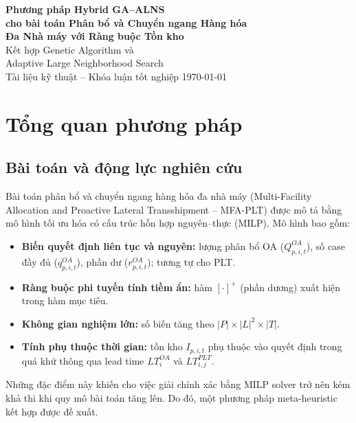 \documentclass[12pt]{article}
\newcommand{\QOA}{Q^{OA}}
\newcommand{\qOA}{q^{OA}}
\newcommand{\rOA}{r^{OA}}
\newcommand{\pos}[1]{\left[#1\right]^+}
\begin{document}
\begin{titlepage}
  \centering
  \vspace*{2cm}
  {\LARGE\bfseries Phương pháp Hybrid GA--ALNS\\[0.5em]
  cho bài toán Phân bổ và Chuyển ngang Hàng hóa\\[0.5em]
  Đa Nhà máy với Ràng buộc Tồn kho}\\[2cm]
  {\large Kết hợp Genetic Algorithm và\\
  Adaptive Large Neighborhood Search}\\[3cm]
  {\normalsize Tài liệu kỹ thuật -- Khóa luận tốt nghiệp}
  \vfill
  {\large \today}
\end{titlepage}

\tableofcontents
\newpage


\section{Tổng quan phương pháp}

\subsection{Bài toán và động lực nghiên cứu}

Bài toán phân bổ và chuyển ngang hàng hóa đa nhà máy (Multi-Facility Allocation and Proactive Lateral Transshipment -- MFA-PLT) được mô tả bằng mô hình tối ưu hóa có cấu trúc hỗn hợp nguyên--thực (MILP). Mô hình bao gồm:

\begin{itemize}
  \item \textbf{Biến quyết định liên tục và nguyên:} lượng phân bổ OA ($\QOA_{p,i,t}$), số case đầy đủ ($\qOA_{p,i,t}$), phần dư ($\rOA_{p,i,t}$); tương tự cho PLT.
  \item \textbf{Ràng buộc phi tuyến tính tiềm ẩn:} hàm $\pos{\cdot}$ (phần dương) xuất hiện trong hàm mục tiêu.
  \item \textbf{Không gian nghiệm lớn:} số biến tăng theo $|P| \times |L|^2 \times |T|$.
  \item \textbf{Tính phụ thuộc thời gian:} tồn kho $I_{p,i,t}$ phụ thuộc vào quyết định trong quá khứ thông qua lead time $LT_i^{OA}$ và $LT_{i,j}^{PLT}$.
\end{itemize}

Những đặc điểm này khiến cho việc giải chính xác bằng MILP solver trở nên kém khả thi khi quy mô bài toán tăng lên. Do đó, một phương pháp meta-heuristic kết hợp được đề xuất.
\end{document}
